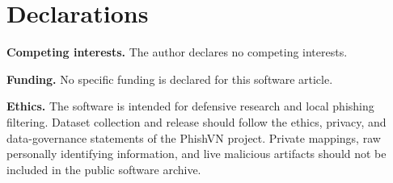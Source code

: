 \section*{Declarations}

\textbf{Competing interests.} The author declares no competing interests.

\textbf{Funding.} No specific funding is declared for this software article.

\textbf{Ethics.} The software is intended for defensive research and local phishing filtering. Dataset collection and release should follow the ethics, privacy, and data-governance statements of the PhishVN project. Private mappings, raw personally identifying information, and live malicious artifacts should not be included in the public software archive.
